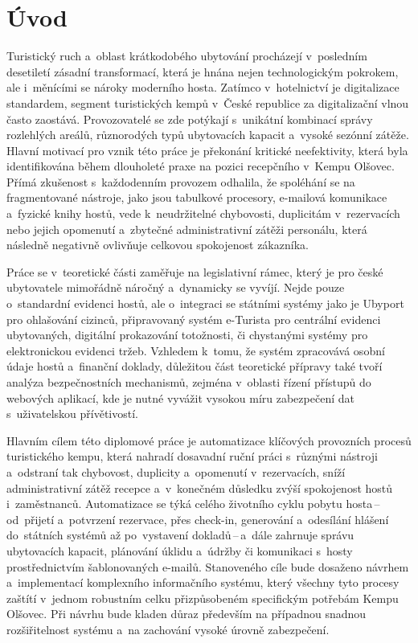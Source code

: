 \chapter{Úvod}
\label{chapter:intro}
Turistický ruch a~oblast krátkodobého ubytování procházejí v~posledním desetiletí zásadní transformací, která je hnána nejen technologickým pokrokem, ale i~měnícími se nároky moderního hosta.
Zatímco v~hotelnictví je digitalizace standardem, segment turistických kempů v~České republice za digitalizační vlnou často zaostává.
Provozovatelé se zde potýkají s~unikátní kombinací správy rozlehlých areálů, různorodých typů ubytovacích kapacit a~vysoké sezónní zátěže.
Hlavní motivací pro vznik této práce je překonání kritické ne\-e\-fe\-kti\-vi\-ty, která byla identifikována během  dlouholeté praxe na pozici recepčního v~Kempu Olšovec.
Přímá zkušenost s~každodenním provozem odhalila, že spoléhání se na fragmentované nástroje, jako jsou tabulkové procesory, e-mailová komunikace a~fyzické knihy hostů, vede k~neudržitelné chybovosti, duplicitám v~rezervacích nebo jejich opomenutí a~zbytečné administrativní zátěži personálu, která následně negativně ovlivňuje celkovou spokojenost zákazníka.

Práce se v~teoretické části zaměřuje na legislativní rámec, který je pro české ubytovatele mimořádně náročný a~dynamicky se vyvíjí.
Nejde pouze o~standardní evidenci hostů, ale o~integraci se státními systémy jako je Ubyport pro ohlašování cizinců, připravovaný systém e-Turista pro centrální evidenci ubytovaných, digitální prokazování totožnosti, či chystanými systémy pro elektronickou evidenci tržeb.
Vzhledem k~tomu, že systém zpracovává osobní údaje hostů a~finanční doklady, důležitou část teoretické přípravy také tvoří analýza bezpečnostních mechanismů, zejména v~oblasti řízení přístupů do webových aplikací, kde je nutné vyvážit vysokou míru zabezpečení dat s~uživatelskou přívětivostí.

Hlavním cílem této diplomové práce je automatizace klíčových provozních procesů turistického kempu, která nahradí dosavadní ruční práci s~různými nástroji a~odstraní tak chybovost, duplicity a~opomenutí v~rezervacích, sníží administrativní zátěž recepce a~v~konečném důsledku zvýší spokojenost hostů i~zaměstnanců.
Automatizace se týká celého životního cyklu pobytu hosta\,--\,od~přijetí a~potvrzení rezervace, přes check-in, generování a~odesílání hlášení do~státních systémů až po~vystavení dokladů\,--\,a~dále zahrnuje správu ubytovacích kapacit, plánování úklidu a~údržby či komunikaci s~hosty prostřednictvím šablonovaných e-mailů.
Stanoveného cíle bude dosaženo návrhem a~implementací komplexního informačního systému, který všechny tyto procesy zaštítí v~jednom robustním celku přizpůsobeném specifickým potřebám Kempu Olšovec.
Při návrhu bude kladen důraz především na případnou snadnou rozšiřitelnost systému a~na zachování vysoké úrovně zabezpečení.

